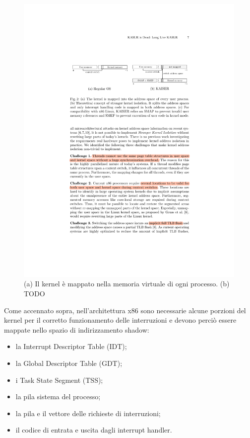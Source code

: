 \begin{figure}
	\centering
	\includegraphics[width=\textwidth]{"img/memoria-shadow.pdf"}
	\caption{(a) Il kernel è mappato nella memoria virtuale di ogni processo. (b) TODO}
	\label{fig:memoria-shadow}
\end{figure}

Come accennato sopra, nell'architettura x86 sono necessarie alcune porzioni del kernel per il corretto funzionamento delle interruzioni e devono perciò essere mappate nello spazio di indirizzamento shadow:
\begin{itemize}
	\item la Interrupt Descriptor Table (IDT);
	\item la Global Descriptor Table (GDT);
	\item i Task State Segment (TSS);
	\item la pila sistema del processo;
	\item la pila e il vettore delle richieste di interruzioni;
	\item il codice di entrata e uscita dagli interrupt handler.
\end{itemize}
